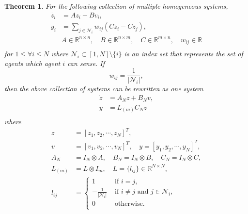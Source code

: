\documentclass[11pt, a4paper, oneside, openany, reqno]{book}
\newtheorem{theorem}{Theorem}[chapter]
\theoremstyle{definition}
\theoremstyle{remark}
\numberwithin{equation}{chapter} %
\newcommand{\R}{\ensuremath{{\mathbb R}}}
\newcommand{\NBR}{\mathcal{N}}
\begin{document}
\begin{theorem}\label{laplacianform}
	For the following collection of multiple homogeneous systems,
	\begin{equation}\begin{split}
	\dot{z_i}&=Az_i+Bv_i, \\
	y_i & =\sum_{j \in \NBR_i}w_{ij}(Cz_i-Cz_j),  \\
	& A \in \R^{n \times n},\quad B \in \R^{n \times m}, 
	\quad C \in \R^{m \times n}, \quad w_{ij} \in \R  \\
	\end{split}\end{equation} 
	for $ 1 \leq \forall i \leq N $ 
	where $  \NBR_i \subset [1,N] \setminus \lbrace i \rbrace $ 
	is an index set that represents the set of agents which agent $ i $ can sense.
	If
	\begin{equation}\label{weightcond}
	w_{ij} = \frac{1}{\vert \NBR_i \vert},
	\end{equation}
	then the above collection of systems can be rewritten as one system
	\begin{equation}\begin{split}
	\dot{z} &= A_N z + B_N v, \\
	y &= L_{(m)} C_N z \\
	\end{split}\end{equation}
	where
	\begin{equation}\begin{split}\label{whereterms}
	z &= \left[ z_1,z_2,\cdots,z_N \right] ^T, \\
	v &= \left[ v_1,v_2,\cdots,v_N \right] ^T, \quad
	y = \left[ y_1,y_2,\cdots,y_N \right] ^T, \\
	A_N & = I_N \otimes A, \quad B_N  = I_N \otimes B, \quad C_N  = I_N \otimes C,\\
	L_{(m)} & = L \otimes I_m, \quad L=\lbrace l_{ij} \rbrace  \in \R^{N \times N}, \\
	l_{ij}&=\begin{cases}
	1 & \text{ if } i=j,  \\
	-\frac{1}{\vert \NBR_i \vert} & \text{ if } i \neq j \text{ and } j \in \NBR_i , \\
	0 & \text{ otherwise.}  \\
	\end{cases}\\
	\end{split}\end{equation}
\end{theorem}
\end{document}

